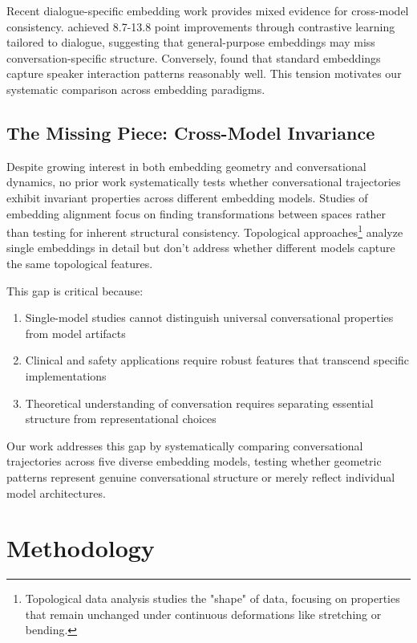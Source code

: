\documentclass[11pt,letterpaper]{article}
\begin{document}
Recent dialogue-specific embedding work provides mixed evidence for cross-model consistency. \citet{dialoguecse2021} achieved 8.7-13.8 point improvements through contrastive learning tailored to dialogue, suggesting that general-purpose embeddings may miss conversation-specific structure. Conversely, \citet{dial2vec2022} found that standard embeddings capture speaker interaction patterns reasonably well. This tension motivates our systematic comparison across embedding paradigms.

\subsection{The Missing Piece: Cross-Model Invariance}

Despite growing interest in both embedding geometry and conversational dynamics, no prior work systematically tests whether conversational trajectories exhibit invariant properties across different embedding models. Studies of embedding alignment \citep{conneau2018word} focus on finding transformations between spaces rather than testing for inherent structural consistency. Topological approaches\footnote{Topological data analysis studies the "shape" of data, focusing on properties that remain unchanged under continuous deformations like stretching or bending.} \citep{jakubowski2020topology, vukovic2022dialogue} analyze single embeddings in detail but don't address whether different models capture the same topological features.

This gap is critical because:
\begin{enumerate}
\item Single-model studies cannot distinguish universal conversational properties from model artifacts
\item Clinical and safety applications require robust features that transcend specific implementations  
\item Theoretical understanding of conversation requires separating essential structure from representational choices
\end{enumerate}

Our work addresses this gap by systematically comparing conversational trajectories across five diverse embedding models, testing whether geometric patterns represent genuine conversational structure or merely reflect individual model architectures.

\section{Methodology}
\end{document}
